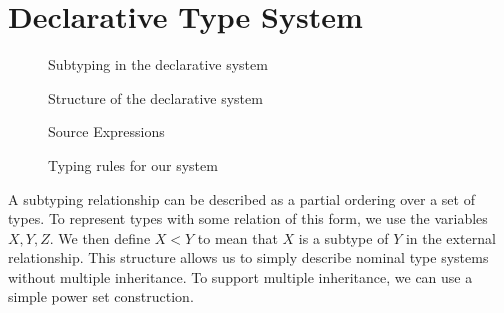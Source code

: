 \documentclass{sig-alternate}
\begin{document}



\section{Declarative Type System}

\begin{figure}

\small
\caption{Subtyping in the declarative system}
\end{figure}
\begin{figure}

\small
\label{fig:declCons}
\caption{Structure of the declarative system}
\end{figure}
\begin{figure}


\small
\label{fig:terms}
\caption{Source Expressions}
\end{figure}
\begin{figure}
\small

\caption{Typing rules for our system}
\end{figure}

A subtyping relationship can be described as a partial ordering over a set of types. To represent types with some relation of this form, we use the variables $X,Y,Z$. We then define $X < Y$ to mean that $X$ is a subtype of $Y$ in the external relationship. This structure allows us to simply describe nominal type systems without multiple inheritance. To support multiple inheritance, we can use a simple power set construction.
\end{document}
